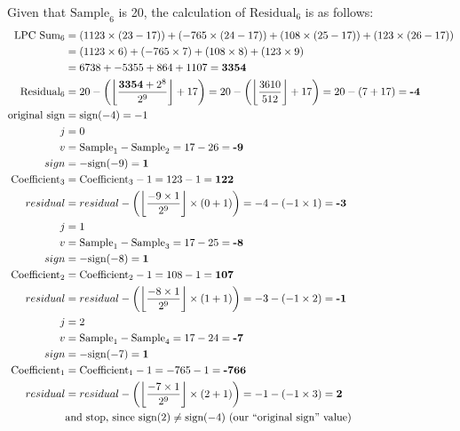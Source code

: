 \clearpage

Given that $\text{Sample}_6$ is 20, the calculation of $\text{Residual}_6$
is as follows:
\begin{align*}
\text{LPC Sum}_6 &= (1123 \times (23 - 17)) + (-765 \times (24 - 17)) + (108 \times (25 - 17)) + (123 \times (26 - 17)) \\
&= (1123 \times 6) + (-765 \times 7) + (108 \times 8) + (123 \times 9) \\
&= 6738 + -5355 + 864 + 1107 = \textbf{3354} \\
\text{Residual}_6 &= 20 - \left( \left\lfloor \frac{\textbf{3354} + 2^8}{2 ^ 9}\right\rfloor + 17 \right) =  20 - \left( \left\lfloor \frac{3610}{512} \right\rfloor + 17 \right) = 20 - (7 + 17) = \textbf{-4} \\
\text{original sign} &= \text{sign}(-4) = -1 \\
j &= 0 \\
v &= \text{Sample}_1 - \text{Sample}_2 = 17 - 26 = \textbf{-9} \\
sign &= -\text{sign}(-9) = \textbf{1} \\
\text{Coefficient}_3 &= \text{Coefficient}_3 - 1 = 123 - 1 = \textbf{122} \\
residual &= residual - \left( \left\lfloor\frac{-9 \times 1}{2 ^ 9}\right\rfloor \times (0 + 1)\right) = -4 - (-1 \times 1) = \textbf{-3} \\
j &= 1 \\
v &= \text{Sample}_1 - \text{Sample}_3 = 17 - 25 = \textbf{-8} \\
sign &= -\text{sign}(-8) = \textbf{1} \\
\text{Coefficient}_2 &= \text{Coefficient}_2 - 1 = 108 - 1 = \textbf{107} \\
residual &= residual - \left( \left\lfloor\frac{-8 \times 1}{2 ^ 9}\right\rfloor \times (1 + 1)\right) = -3 - (-1 \times 2) = \textbf{-1} \\
j &= 2 \\
v &= \text{Sample}_1 - \text{Sample}_4 = 17 - 24 = \textbf{-7} \\
sign &= -\text{sign}(-7) = \textbf{1} \\
\text{Coefficient}_1 &= \text{Coefficient}_1 - 1 = -765 - 1 = \textbf{-766} \\
residual &= residual - \left( \left\lfloor\frac{-7 \times 1}{2 ^ 9}\right\rfloor \times (2 + 1)\right) = -1 - (-1 \times 3) = \textbf{2} \\
&\text{and stop, since sign}(2) \neq \text{sign}(-4) \text{ (our ``{original sign}'' value)}
\end{align*}


